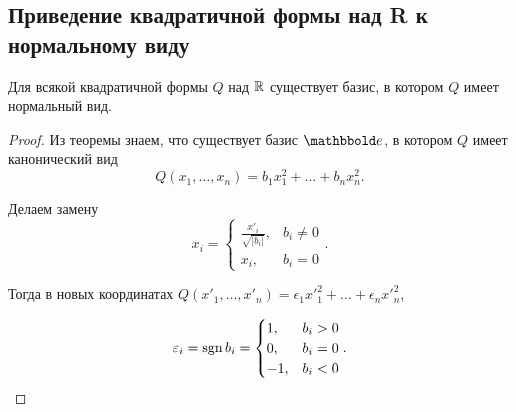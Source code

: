 \subsection{Приведение квадратичной формы над R к нормальному виду}

\begin{corollary}
    Для всякой квадратичной формы $Q$ над $\mathbb{R}$ существует базис, в котором $Q$ имеет нормальный вид.
\end{corollary}

\begin{proof}
    Из теоремы знаем, что существует базис $\E$, в котором $Q$ имеет канонический вид
    \begin{equation*}
        Q(x_1, \dots, x_n) = b_1 x_1^2 + \dots + b_n x_n^2
    .\end{equation*}

    Делаем замену
    \begin{equation*}
        x_i = \begin{cases}
            \frac{x'_i}{\sqrt{|b_i|}}, &b_i \neq 0 \\
            x_i, &b_i = 0
        \end{cases}
    .\end{equation*}

    Тогда в новых координатах $Q(x'_1, \dots, x'_n) = \epsilon_1 x'^2_1 + \dots + \epsilon_n x'^2_n$,

    \begin{equation*}
        \varepsilon_i = \operatorname{\mathop{\mathrm{sgn}}} b_i = \begin{cases}
            1, &b_i > 0 \\
            0, &b_i = 0 \\
            -1, &b_i < 0
        \end{cases}
    .\end{equation*}
\end{proof}
